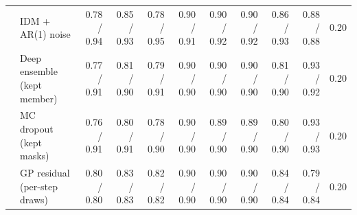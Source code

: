 \begin{longtable}{llrrrrrrrrr}
 & IDM + AR(1) noise & 0.78 / 0.94 & 0.85 / 0.93 & 0.78 / 0.95 & 0.90 / 0.91 & 0.90 / 0.92 & 0.90 / 0.92 & 0.86 / 0.93 & 0.88 / 0.88 & 0.20 \\
 & Deep ensemble (kept member) & 0.77 / 0.91 & 0.81 / 0.90 & 0.79 / 0.91 & 0.90 / 0.90 & 0.90 / 0.90 & 0.90 / 0.90 & 0.81 / 0.90 & 0.93 / 0.92 & 0.20 \\
 & MC dropout (kept masks) & 0.76 / 0.91 & 0.80 / 0.91 & 0.78 / 0.90 & 0.90 / 0.90 & 0.89 / 0.90 & 0.89 / 0.90 & 0.80 / 0.90 & 0.93 / 0.93 & 0.20 \\
 & GP residual (per-step draws) & 0.80 / 0.80 & 0.83 / 0.83 & 0.82 / 0.82 & 0.90 / 0.90 & 0.90 / 0.90 & 0.90 / 0.90 & 0.84 / 0.84 & 0.79 / 0.84 & 0.20 \\
\end{longtable}
\endgroup
